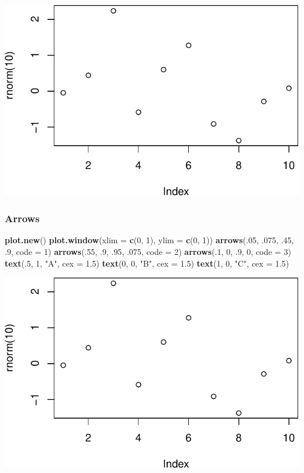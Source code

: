 \documentclass[]{book}
\newenvironment{Shaded}{\begin{snugshade}}{\end{snugshade}}
\newcommand{\KeywordTok}[1]{\textcolor[rgb]{0.13,0.29,0.53}{\textbf{#1}}}
\newcommand{\DataTypeTok}[1]{\textcolor[rgb]{0.13,0.29,0.53}{#1}}
\newcommand{\DecValTok}[1]{\textcolor[rgb]{0.00,0.00,0.81}{#1}}
\newcommand{\FloatTok}[1]{\textcolor[rgb]{0.00,0.00,0.81}{#1}}
\newcommand{\StringTok}[1]{\textcolor[rgb]{0.31,0.60,0.02}{#1}}
\newcommand{\NormalTok}[1]{#1}
\theoremstyle{definition}
\theoremstyle{definition}
\theoremstyle{definition}
\theoremstyle{remark}
\begin{document}
\includegraphics[width=0.5\linewidth]{Rcourse_files/figure-latex/unnamed-chunk-257-1}

\subsubsection{Arrows}\label{arrows}

\begin{Shaded}
\begin{Highlighting}[]
\KeywordTok{plot.new}\NormalTok{()}
\KeywordTok{plot.window}\NormalTok{(}\DataTypeTok{xlim =} \KeywordTok{c}\NormalTok{(}\DecValTok{0}\NormalTok{, }\DecValTok{1}\NormalTok{), }\DataTypeTok{ylim =} \KeywordTok{c}\NormalTok{(}\DecValTok{0}\NormalTok{, }\DecValTok{1}\NormalTok{))}
\KeywordTok{arrows}\NormalTok{(.}\DecValTok{05}\NormalTok{, .}\DecValTok{075}\NormalTok{, .}\DecValTok{45}\NormalTok{, .}\DecValTok{9}\NormalTok{, }\DataTypeTok{code =} \DecValTok{1}\NormalTok{)}
\KeywordTok{arrows}\NormalTok{(.}\DecValTok{55}\NormalTok{, .}\DecValTok{9}\NormalTok{, .}\DecValTok{95}\NormalTok{, .}\DecValTok{075}\NormalTok{, }\DataTypeTok{code =} \DecValTok{2}\NormalTok{)}
\KeywordTok{arrows}\NormalTok{(.}\DecValTok{1}\NormalTok{, }\DecValTok{0}\NormalTok{, .}\DecValTok{9}\NormalTok{, }\DecValTok{0}\NormalTok{, }\DataTypeTok{code =} \DecValTok{3}\NormalTok{)}
\KeywordTok{text}\NormalTok{(.}\DecValTok{5}\NormalTok{, }\DecValTok{1}\NormalTok{, }\StringTok{"A"}\NormalTok{, }\DataTypeTok{cex =} \FloatTok{1.5}\NormalTok{)}
\KeywordTok{text}\NormalTok{(}\DecValTok{0}\NormalTok{, }\DecValTok{0}\NormalTok{, }\StringTok{"B"}\NormalTok{, }\DataTypeTok{cex =} \FloatTok{1.5}\NormalTok{)}
\KeywordTok{text}\NormalTok{(}\DecValTok{1}\NormalTok{, }\DecValTok{0}\NormalTok{, }\StringTok{"C"}\NormalTok{, }\DataTypeTok{cex =} \FloatTok{1.5}\NormalTok{)}
\end{Highlighting}
\end{Shaded}

\includegraphics[width=0.5\linewidth]{Rcourse_files/figure-latex/unnamed-chunk-258-1}
\end{document}
